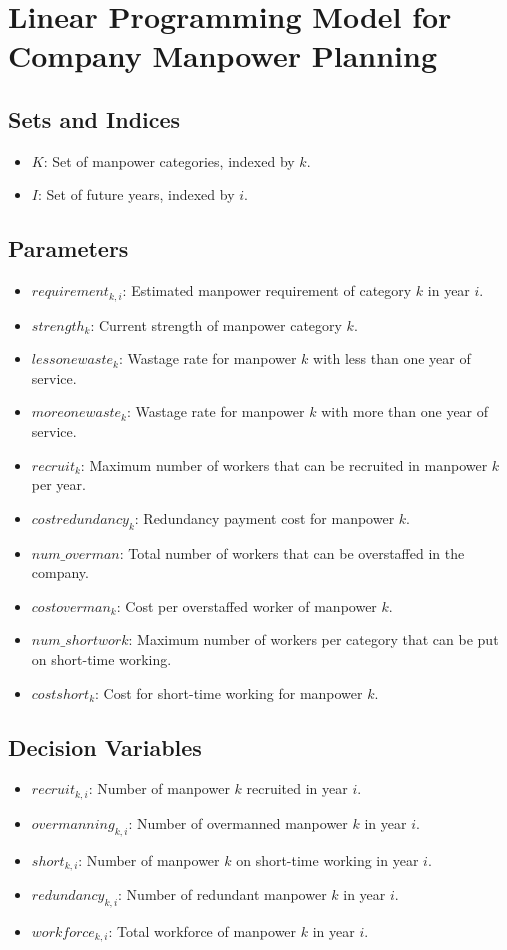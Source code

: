 \documentclass{article}
\begin{document}
\section*{Linear Programming Model for Company Manpower Planning}

\subsection*{Sets and Indices}
\begin{itemize}
    \item $K$: Set of manpower categories, indexed by $k$.
    \item $I$: Set of future years, indexed by $i$.
\end{itemize}

\subsection*{Parameters}
\begin{itemize}
    \item $requirement_{k,i}$: Estimated manpower requirement of category $k$ in year $i$.
    \item $strength_{k}$: Current strength of manpower category $k$.
    \item $lessonewaste_{k}$: Wastage rate for manpower $k$ with less than one year of service.
    \item $moreonewaste_{k}$: Wastage rate for manpower $k$ with more than one year of service.
    \item $recruit_{k}$: Maximum number of workers that can be recruited in manpower $k$ per year.
    \item $costredundancy_{k}$: Redundancy payment cost for manpower $k$.
    \item $num\_overman$: Total number of workers that can be overstaffed in the company.
    \item $costoverman_{k}$: Cost per overstaffed worker of manpower $k$.
    \item $num\_shortwork$: Maximum number of workers per category that can be put on short-time working.
    \item $costshort_{k}$: Cost for short-time working for manpower $k$.
\end{itemize}

\subsection*{Decision Variables}
\begin{itemize}
    \item $recruit_{k,i}$: Number of manpower $k$ recruited in year $i$.
    \item $overmanning_{k,i}$: Number of overmanned manpower $k$ in year $i$.
    \item $short_{k,i}$: Number of manpower $k$ on short-time working in year $i$.
    \item $redundancy_{k,i}$: Number of redundant manpower $k$ in year $i$.
    \item $workforce_{k,i}$: Total workforce of manpower $k$ in year $i$.
\end{itemize}
\end{document}
